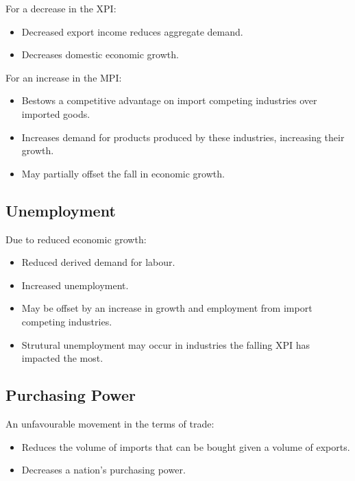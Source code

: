 \documentclass[a4paper,11pt]{article}
\begin{document}
For a decrease in the XPI:

\begin{itemize}
\item Decreased export income reduces aggregate demand.
\item Decreases domestic economic growth.
\end{itemize}

For an increase in the MPI:

\begin{itemize}
\item Bestows a competitive advantage on import competing industries over
	imported goods.
\item Increases demand for products produced by these industries, increasing
	their growth.
\item May partially offset the fall in economic growth.
\end{itemize}


\subsection{Unemployment}

Due to reduced economic growth:

\begin{itemize}
\item Reduced derived demand for labour.
\item Increased unemployment.
\item May be offset by an increase in growth and employment from import
	competing industries.
\item Strutural unemployment may occur in industries the falling XPI has
	impacted the most.
\end{itemize}


\subsection{Purchasing Power}

An unfavourable movement in the terms of trade:

\begin{itemize}
\item Reduces the volume of imports that can be bought given a volume of
	exports.
\item Decreases a nation's purchasing power.
\end{itemize}
\end{document}
